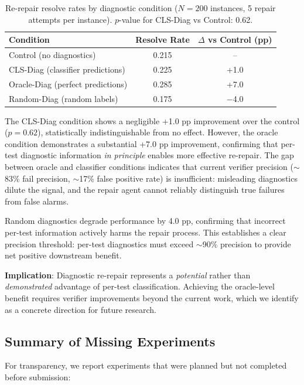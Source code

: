 \documentclass[11pt]{article}
\begin{document}
\begin{table}[t]
\centering
\caption{Re-repair resolve rates by diagnostic condition ($N = 200$ instances, 5 repair attempts per instance). $p$-value for CLS-Diag vs Control: 0.62.}
\label{tab:rerepair}
\begin{tabular}{lcc}
\toprule
Condition & Resolve Rate & $\Delta$ vs Control (pp) \\
\midrule
Control (no diagnostics) & 0.215 & -- \\
CLS-Diag (classifier predictions) & 0.225 & +1.0 \\
Oracle-Diag (perfect predictions) & 0.285 & +7.0 \\
Random-Diag (random labels) & 0.175 & $-$4.0 \\
\bottomrule
\end{tabular}
\end{table}

The CLS-Diag condition shows a negligible +1.0 pp improvement over the control ($p = 0.62$), statistically indistinguishable from no effect. However, the oracle condition demonstrates a substantial +7.0 pp improvement, confirming that per-test diagnostic information \emph{in principle} enables more effective re-repair. The gap between oracle and classifier conditions indicates that current verifier precision ($\sim$83\% fail precision, $\sim$17\% false positive rate) is insufficient: misleading diagnostics dilute the signal, and the repair agent cannot reliably distinguish true failures from false alarms.

Random diagnostics degrade performance by 4.0 pp, confirming that incorrect per-test information actively harms the repair process. This establishes a clear precision threshold: per-test diagnostics must exceed $\sim$90\% precision to provide net positive downstream benefit.

\textbf{Implication}: Diagnostic re-repair represents a \emph{potential} rather than \emph{demonstrated} advantage of per-test classification. Achieving the oracle-level benefit requires verifier improvements beyond the current work, which we identify as a concrete direction for future research.

\subsection{Summary of Missing Experiments}
\label{sec:missing}

For transparency, we report experiments that were planned but not completed before submission:
\end{document}

